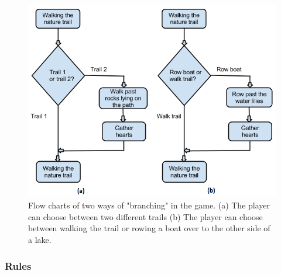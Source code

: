 \begin{figure} [H]
\centering
\includegraphics[scale=0.77]{flowchart}
\caption[Flow chart of branching]{Flow charts of two ways of "branching" in the game. (a) The player can choose between two different trails (b) The player can choose between walking the trail or rowing a boat over to the other side of a lake.}
\label{fig:flowchart}
\end{figure} 

\subsubsection{Rules} 
 
